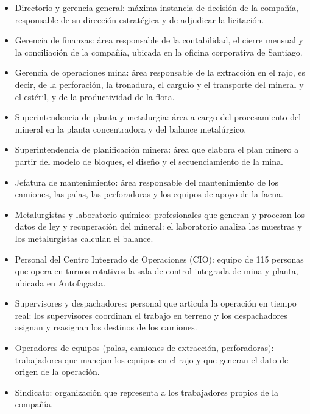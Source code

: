 \documentclass[anexo]{../../comun/overfore}
\begin{document}
\begin{itemize}
\item Directorio y gerencia general: máxima instancia de decisión de la compañía, responsable de su dirección estratégica y de adjudicar la licitación.
\item Gerencia de finanzas: área responsable de la contabilidad, el cierre mensual y la conciliación de la compañía, ubicada en la oficina corporativa de Santiago.
\item Gerencia de operaciones mina: área responsable de la extracción en el rajo, es decir, de la perforación, la tronadura, el carguío y el transporte del mineral y el estéril, y de la productividad de la flota.
\item Superintendencia de planta y metalurgia: área a cargo del procesamiento del mineral en la planta concentradora y del balance metalúrgico.
\item Superintendencia de planificación minera: área que elabora el plan minero a partir del modelo de bloques, el diseño y el secuenciamiento de la mina.
\item Jefatura de mantenimiento: área responsable del mantenimiento de los camiones, las palas, las perforadoras y los equipos de apoyo de la faena.
\item Metalurgistas y laboratorio químico: profesionales que generan y procesan los datos de ley y recuperación del mineral: el laboratorio analiza las muestras y los metalurgistas calculan el balance.
\item Personal del Centro Integrado de Operaciones (CIO): equipo de 115 personas que opera en turnos rotativos la sala de control integrada de mina y planta, ubicada en Antofagasta.
\item Supervisores y despachadores: personal que articula la operación en tiempo real: los supervisores coordinan el trabajo en terreno y los despachadores asignan y reasignan los destinos de los camiones.
\item Operadores de equipos (palas, camiones de extracción, perforadoras): trabajadores que manejan los equipos en el rajo y que generan el dato de origen de la operación.
\item Sindicato: organización que representa a los trabajadores propios de la compañía.
\end{itemize}
\end{document}
